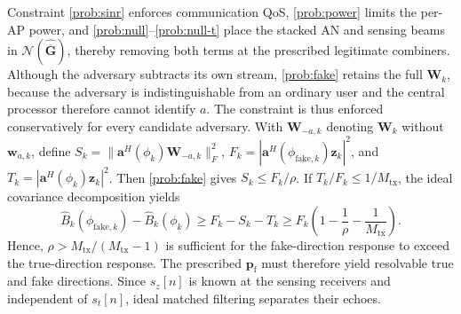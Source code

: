 \documentclass[letterpaper,journal]{IEEEtran}
\begin{document}
Constraint \eqref{prob:sinr} enforces communication QoS, \eqref{prob:power} limits the per-AP power, and \eqref{prob:null}--\eqref{prob:null-t} place the stacked AN and sensing beams in $\mathcal{N}(\widehat{\overline{\mathbf{G}}})$, thereby removing both terms at the prescribed legitimate combiners. Although the adversary subtracts its own stream, \eqref{prob:fake} retains the full $\mathbf W_k$, because the adversary is indistinguishable from an ordinary user and the central processor therefore cannot identify $a$. The constraint is thus enforced conservatively for every candidate adversary. With $\mathbf W_{-a,k}$ denoting $\mathbf W_k$ without $\mathbf w_{a,k}$, define $S_k=\|\mathbf a^H(\phi_k)\mathbf W_{-a,k}\|_F^2$, $F_k=|\mathbf a^H(\phi_{\mathrm{fake},k})\mathbf z_k|^2$, and $T_k=|\mathbf a^H(\phi_k)\mathbf z_k|^2$. Then \eqref{prob:fake} gives $S_k\le F_k/\rho$. If $T_k/F_k\le1/M_{\mathrm{tx}}$, the ideal covariance decomposition yields
\begin{equation}
\widehat B_k(\phi_{\mathrm{fake},k})-\widehat B_k(\phi_k)
\ge F_k-S_k-T_k
\ge F_k\left(1-\frac{1}{\rho}-\frac{1}{M_{\mathrm{tx}}}\right).
\label{eq:fake-dominance}
\end{equation}
Hence, $\rho>M_{\mathrm{tx}}/(M_{\mathrm{tx}}-1)$ is sufficient for the fake-direction response to exceed the true-direction response. The prescribed $\mathbf p_{\mathrm f}$ must therefore yield resolvable true and fake directions. Since $s_z[n]$ is known at the sensing receivers and independent of $s_t[n]$, ideal matched filtering separates their echoes.
\end{document}
